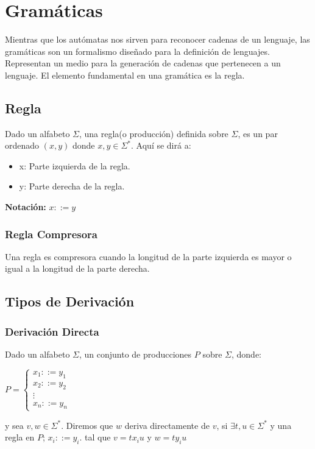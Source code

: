 \chapter{Gramáticas}

Mientras que los autómatas nos sirven para reconocer cadenas de un lenguaje, las gramáticas son un formalismo diseñado para la definición de lenguajes. Representan un medio para la generación de cadenas que pertenecen a un lenguaje. El elemento fundamental en una gramática es la regla.

\section{Regla}

Dado un alfabeto $\Sigma$, una regla(o producción) definida sobre $\Sigma$, es un par ordenado $(x,y)$ donde $x,y\in \Sigma^*$. Aquí se dirá a:
\begin{itemize}
\item x: Parte izquierda de la regla.
\item y: Parte derecha de la regla.
\end{itemize}

\textbf{Notación: }$x::=y$

\subsection{Regla Compresora}
Una regla es compresora cuando la longitud de la parte izquierda es mayor o igual a la longitud de la parte derecha.

\section{Tipos de Derivación}
\subsection{Derivación Directa}
Dado un alfabeto $\Sigma$, un conjunto de producciones $P$ sobre $\Sigma$, donde:

$P= \left \{ \begin{array}{c}
					x_1::=y_1\\
					x_2::=y_2\\
					\vdots \\
					x_n::=y_n \end{array} \right.$
					

y sea $v,w\in \Sigma^*$. Diremos que $w$ deriva directamente de $v$, si $\exists t,u \in \Sigma^*$ y una regla en $P$; $x_i::=y_i$. tal que $v=tx_iu$  y  $w=ty_iu$

